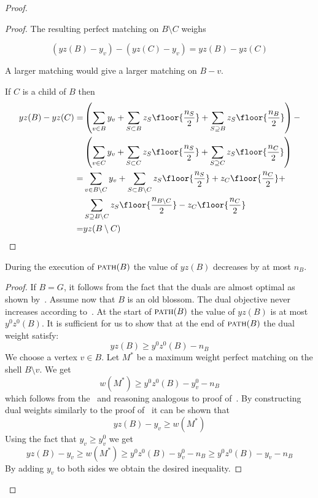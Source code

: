 \begin{proof}
\begin{proof}
    The resulting perfect matching on $B \setminus C$ weighs

    \[ (yz(B) - y_v) - (yz(C) - y_v) = yz(B) - yz(C) \]

    A larger matching would give a larger matching on $B - v$.

    If $C$ is a child of $B$ then
    \begin{align*}
    yz(B) - yz(C) =
      &\left(\sum_{v \in B} y_v + \sum_{S \subset B} z_S \floor{\frac{n_S}{2}} + \sum_{S \supseteq B} z_S \floor{\frac{n_B}{2}}\right) - \\
    &\left(\sum_{v \in C} y_v + \sum_{S \subset C} z_S \floor{\frac{n_S}{2}} + \sum_{S \supseteq C} z_S \floor{\frac{n_C}{2}}\right)  \\
    = &\sum_{v \in B \setminus C} y_v + \sum_{S \subset B \setminus C} z_S \floor{\frac{n_S}{2}} + z_C\floor{\frac{n_C}{2}} + \\
    &\sum_{S \supseteq B \setminus C} z_S \floor{\frac{n_{B \setminus C}}{2}} - z_C\floor{\frac{n_C}{2}} \\
    = &yz(B \setminus C)
    \end{align*}
\end{proof}

\begin{lemma}\label{lem:pathyz}
    During the execution of $\textsc{path}(B)$ the value of $yz(B)$ decreases by at most $n_B$.
\end{lemma}

\begin{proof}
    If $B = G$, it follows from the fact that the duals are almost optimal as shown by~.
    Assume now that $B$ is an old blossom. The dual objective never increases according to~. At the start of $\textsc{path}(B)$ the value of $yz(B)$ is at most $y^0z^0(B)$. It is sufficient for us to show that at the end of $\textsc{path}(B)$ the dual weight satisfy:
    \[ yz(B) \geq y^0z^0(B) - n_B \]
    We choose a vertex $v \in B$. Let $M^*$ be a maximum weight perfect matching on the shell $B \setminus v$. We get
    \[ w(M^*) \geq y^0z^0(B) - y^0_v - n_B \]
    which follows from the~ and reasoning analogous to proof of~. By constructing dual weights similarly to the proof of~ it can be shown that
    \[ yz(B) - y_v \geq w(M^*) \]
    Using the fact that $y_v \geq y_v^0$ we get
    \[ yz(B) - y_v \geq w(M^*) \geq y^0z^0(B) - y^0_v - n_B \geq y^0z^0(B) - y_v - n_B \]
    By adding $y_v$ to both sides we obtain the desired inequality.
\end{proof}


\end{proof}
